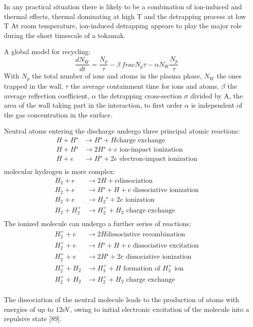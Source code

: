 In any practical situation there is likely to be a combination of ion-induced and thermal effects, thermal dominating at high T and the detrapping process at low T
At room temperature, ion-induced detrapping appears to play the major role during the short timescale of a tokamak.

A global model for recycling:
\begin{equation}
    \frac{dN_W}{dt} = \frac{N_p}{\tau} - \beta \ frac{N_p}{\tau} - \alpha N_W \frac{N_p}{\tau}
\end{equation}
With $N_p$ the total number of ions and atoms in the plasma phase, $N_W$ the
ones trapped in the wall, $\tau$ the average containment time for ions and
atoms, $\beta$ the average reflection coefficient, $\alpha $ the detrapping
cross-section $\sigma$ divided by A, the area of the wall taking part in the
interaction, to first order $\alpha$ is independent of the gas concentration in
the surface.

Neutral atoms entering the discharge undergo three principal atomic reactions:
\begin{eqnarray}
    H + H⁺ &\rightarrow H⁺ + H \text{charge exchange}\\
    H + H⁺ &\rightarrow 2H⁺ + e\text{ ion-impact ionization}\\
    H + e &\rightarrow H⁺ + 2e\text{ electron-impact ionization}\\
\end{eqnarray}
molecular hydrogen is more complex:
\begin{eqnarray}
    H_2 + e &\rightarrow 2H + e \text{dissociation}\\
    H_2 + e &\rightarrow H⁺ + H + e\text{ dissociative ionization}\\
    H_2 + e &\rightarrow H_2⁺ + 2e\text{ ionization}\\
    H_2 + H_2^+ &\rightarrow H_2^+ + H_2\text{ charge exchange}\\
\end{eqnarray}
The ionized molecule can undergo a further series of reactions:
\begin{eqnarray}
    H_2^+ + e &\rightarrow 2H \text{dissociative recombination}\\
    H_2^+ + e &\rightarrow H⁺ + H + e\text{ dissociative excitation}\\
    H_2^+ + e &\rightarrow 2H⁺ + 2e\text{ dissociative ionization}\\
    H_2^+ + H_2 &\rightarrow H_3^+ + H\text{ formation of $H_3^+$ ion}\\
    H_2^+ + H_2 &\rightarrow H_2^+ + H_2\text{ charge exchange}\\
\end{eqnarray}

The dissociation of the neutral molecule leads to the production  of atoms with energies of up to 12eV, owing to initial electronic excitation of the molecule into a repulsive state [89].
